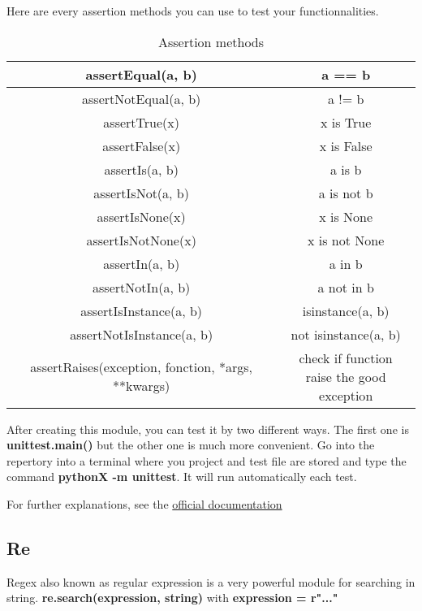 \documentclass[a4paper, 12pt, titlepage]{scrartcl} %
\begin{document}
Here are every assertion methods you can use to test your functionnalities.
\begin{table}[h]
\begin{center}
{\renewcommand{\arraystretch}{1} %
{\setlength{\tabcolsep}{0.5cm} %
\begin{tabular}{|c|c|}
  \hline
  assertEqual(a, b) & a == b \\
  \hline
  assertNotEqual(a, b) & a != b \\
  \hline
  assertTrue(x) & x is True \\
  \hline
  assertFalse(x) & x is False \\
  \hline
  assertIs(a, b) & a is b \\
  \hline
  assertIsNot(a, b) & a is not b \\
  \hline
  assertIsNone(x) & x is None \\
  \hline
  assertIsNotNone(x) & x is not None \\
  \hline
  assertIn(a, b) & a in b \\
  \hline
  assertNotIn(a, b) & a not in b \\
  \hline
  assertIsInstance(a, b) & isinstance(a, b) \\
  \hline
  assertNotIsInstance(a, b) & not isinstance(a, b) \\
  \hline
  assertRaises(exception, fonction, *args, **kwargs) & \makecell{check if function \\ raise the good exception}  \\
  \hline
\end{tabular}}}
\end{center}
\caption{Assertion methods}
\end{table}

After creating this module, you can test it by two different ways. The first one is \textbf{unittest.main()} but the other one is much more convenient. Go into the repertory into a terminal where you project and test file are stored and type the command \textbf{pythonX -m unittest}. It will run automatically each test.

\vspace{5mm}

For further explanations, see the \href{https://docs.python.org/3/library/unittest.html}{official documentation}


\subsection{Re}
Regex also known as regular expression is a very powerful module for searching in string. \textbf{re.search(expression, string)} with \textbf{expression = r"..."}
\end{document}
